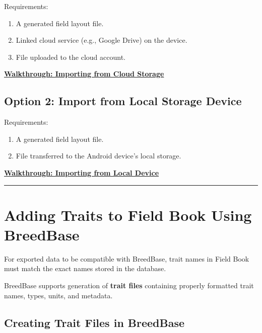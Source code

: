 \documentclass[
  12pt,
]{book}
\providecommand{\tightlist}{%
  \setlength{\itemsep}{0pt}\setlength{\parskip}{0pt}}
\begin{document}
Requirements:

\begin{enumerate}
\def\labelenumi{\arabic{enumi}.}
\tightlist
\item
  A generated field layout file.
\item
  Linked cloud service (e.g., Google Drive) on the device.
\item
  File uploaded to the cloud account.
\end{enumerate}

\href{https://scribehow.com/shared/Importing_Field_Layout_Files_to_Field_Book_from_Cloud_Storage__5JLV59I8TzCgDeTkUPbIdA}{\textbf{Walkthrough: Importing from Cloud Storage}}

\hypertarget{option-2-import-from-local-storage-device}{%
\subsection{Option 2: Import from Local Storage Device}\label{option-2-import-from-local-storage-device}}

Requirements:

\begin{enumerate}
\def\labelenumi{\arabic{enumi}.}
\tightlist
\item
  A generated field layout file.
\item
  File transferred to the Android device's local storage.
\end{enumerate}

\href{link\%20to\%20be\%20added}{\textbf{Walkthrough: Importing from Local Device}}

\begin{center}\rule{0.5\linewidth}{0.5pt}\end{center}

\hypertarget{adding-traits-to-field-book-using-breedbase}{%
\section{Adding Traits to Field Book Using BreedBase}\label{adding-traits-to-field-book-using-breedbase}}

For exported data to be compatible with BreedBase, trait names in Field Book must match the exact names stored in the database.

BreedBase supports generation of \textbf{trait files} containing properly formatted trait names, types, units, and metadata.

\hypertarget{creating-trait-files-in-breedbase}{%
\subsection{Creating Trait Files in BreedBase}\label{creating-trait-files-in-breedbase}}
\end{document}
